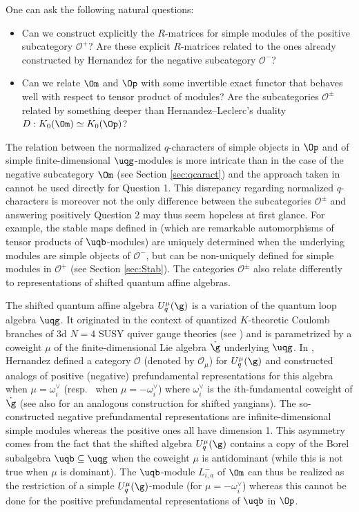 \documentclass[11pt]{amsart}
\theoremstyle{definition}
\theoremstyle{remark}
\numberwithin{equation}{section}
\begin{document}
\par
One can ask the following natural questions:
\begin{itemize}
\item[1.] Can we construct explicitly the $R$-matrices for simple modules of the positive subcategory $\mathcal{O}^+$? Are these explicit $R$-matrices related to the ones already constructed by Hernandez for the negative subcategory $\mathcal{O}^-$?
\item[2.] Can we relate $\Om$ and $\Op$ with some invertible exact functor that behaves well with respect to tensor product of modules? Are the subcategories $\mathcal{O}^{\pm}$ related by something deeper than Hernandez--Leclerc's duality $D:K_0(\Om) \simeq K_0(\Op)$? 
\end{itemize} 
The relation between the normalized $q$-characters of simple objects in $\Op$ and of simple finite-dimensional $\uqg$-modules is more intricate than in the case of the negative subcategory $\Om$ (see Section \ref{sec:qcaract}) and the approach taken in \cite{her} cannot be used directly for Question 1. This disrepancy regarding normalized $q$-characters is moreover not the only difference between the subcategories $\mathcal{O}^{\pm}$ and answering positively Question 2 may thus seem hopeless at first glance. For example, the stable maps defined in \cite{her} (which are remarkable automorphisms of tensor products of $\uqb$-modules) are uniquely determined when the underlying modules are simple objects of $\mathcal{O}^{-}$, but can be non-uniquely defined for simple modules in $\mathcal{O}^+$ (see Section \ref{sec:Stab}). The categories  $\mathcal{O}^{\pm}$ also relate differently to representations of shifted quantum affine algebras. \par
The shifted quantum affine algebra $U_q^{\mu}(\g)$ is a variation of the quantum loop algebra $\uqg$. It originated in the context of quantized $K$-theoretic Coulomb branches of 3d $N=4$ SUSY quiver gauge theories (see \cite{ft}) and is parametrized by a coweight $\mu$ of the finite-dimensional Lie algebra $\dot{\g}$ underlying $\uqg$. In \cite{hshift}, Hernandez defined a category $\mathcal{O}$ (denoted by $\mathcal{O}_{\mu}$) for $U_q^{\mu}(\g)$ and constructed analogs of positive (negative) prefundamental representations for this algebra when $\mu=\omega_i^{\vee}$ (resp.~ when $\mu=-\omega_i^{\vee}$) where $\omega_i^{\vee}$ is the $i$th-fundamental coweight of $\dot{\g}$ (see also \cite{z1} for an analogous construction for shifted yangians). The so-constructed negative prefundamental representations are infinite-dimensional simple modules whereas the positive ones all have dimension 1. This asymmetry comes from the fact that the shifted algebra $U_q^{\mu}(\g)$ contains a copy of the Borel subalgebra $\uqb\subseteq \uqg$ when the coweight $\mu$ is antidominant (while this is not true when $\mu$ is dominant). The $\uqb$-module $L_{i,a}^-$ of $\Om$ can thus be realized as the restriction of a simple $U_q^{\mu}(\g)$-module (for $\mu = -\omega_i^{\vee}$) whereas this cannot be done for the positive prefundamental representations of $\uqb$ in $\Op$.
\end{document}
